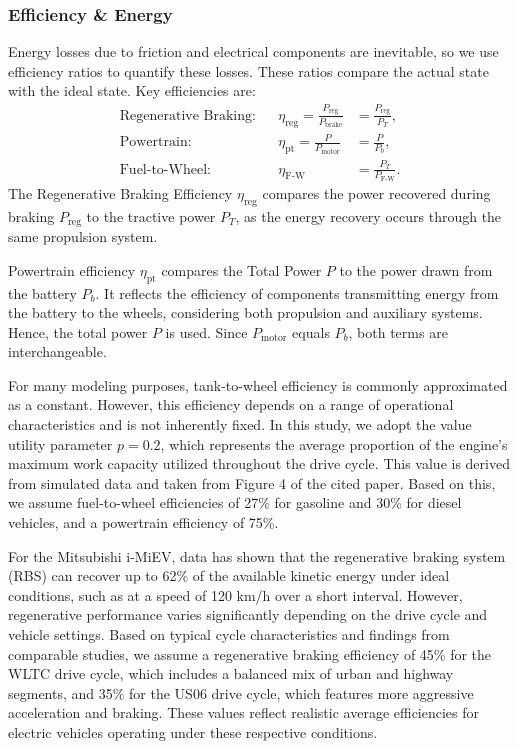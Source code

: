 \subsubsection*{Efficiency \& Energy}
	Energy losses due to friction and electrical components are inevitable, so we use efficiency ratios to quantify these losses. These ratios compare the actual state with the ideal state. Key efficiencies are:
	\begin{align*}
		\text{Regenerative Braking:} && \eta_{\text{reg}} = \frac{P_{\text{reg}}}{P_{\text{brake}}} & = \frac{P_{\text{reg}}}{P_T}, \\
		\text{Powertrain:} && \eta_{\text{pt}} = \frac{P}{P_{\text{motor}}} & = \frac{P}{P_{b}}, \\
		\text{Fuel-to-Wheel:} && \eta_{\text{F-W}} & = \frac{P_T}{P_{\text{F-W}}}.
	\end{align*}
	The Regenerative Braking Efficiency $\eta_{\text{reg}}$ compares the power recovered during braking $P_{\text{reg}}$ to the tractive power $P_T$, as the energy recovery occurs through the same propulsion system.
			
	Powertrain efficiency $\eta_{\text{pt}}$ compares the Total Power $P$ to the power drawn from the battery $P_b$. It reflects the efficiency of components transmitting energy from the battery to the wheels, considering both propulsion and auxiliary systems. Hence, the total power $P$ is used. Since $P_{\text{motor}}$ equals $P_b$, both terms are interchangeable.
	
	For many modeling purposes, tank-to-wheel efficiency is commonly approximated as a constant. However, this efficiency depends on a range of operational characteristics and is not inherently fixed. In this study, we adopt the value utility parameter $p=0.2$, which represents the average proportion of the engine’s maximum work capacity utilized throughout the drive cycle. This value is derived from simulated data and taken from Figure 4 of the cited paper. Based on this, we assume fuel-to-wheel efficiencies of 27\% for gasoline and 30\% for diesel vehicles, and a powertrain efficiency of 75\%. \cite{HJELKREM2020115463}
	
	For the Mitsubishi i-MiEV, data has shown that the regenerative braking system (RBS) can recover up to 62\% of the available kinetic energy under ideal conditions, such as at a speed of 120 km/h over a short interval. However, regenerative performance varies significantly depending on the drive cycle and vehicle settings. Based on typical cycle characteristics and findings from comparable studies, we assume a regenerative braking efficiency of 45\% for the WLTC drive cycle, which includes a balanced mix of urban and highway segments, and 35\% for the US06 drive cycle, which features more aggressive acceleration and braking. These values reflect realistic average efficiencies for electric vehicles operating under these respective conditions. \parencite[p. 1423]{doi:10.1177/0954407017728651}
	
